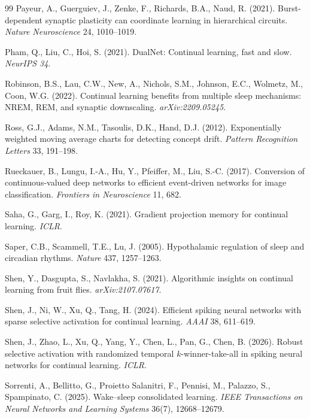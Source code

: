 \documentclass{article}
\begin{document}
\begin{thebibliography}{99}
 Payeur, A., Guerguiev, J., Zenke, F., Richards, B.A., Naud, R. (2021). Burst-dependent synaptic plasticity can coordinate learning in hierarchical circuits. \emph{Nature Neuroscience} 24, 1010--1019.

 Pham, Q., Liu, C., Hoi, S. (2021). DualNet: Continual learning, fast and slow. \emph{NeurIPS 34}.

 Robinson, B.S., Lau, C.W., New, A., Nichols, S.M., Johnson, E.C., Wolmetz, M., Coon, W.G. (2022). Continual learning benefits from multiple sleep mechanisms: NREM, REM, and synaptic downscaling. \emph{arXiv:2209.05245}.

 Ross, G.J., Adams, N.M., Tasoulis, D.K., Hand, D.J. (2012). Exponentially weighted moving average charts for detecting concept drift. \emph{Pattern Recognition Letters} 33, 191--198.

 Rueckauer, B., Lungu, I.-A., Hu, Y., Pfeiffer, M., Liu, S.-C. (2017). Conversion of continuous-valued deep networks to efficient event-driven networks for image classification. \emph{Frontiers in Neuroscience} 11, 682.

 Saha, G., Garg, I., Roy, K. (2021). Gradient projection memory for continual learning. \emph{ICLR}.

 Saper, C.B., Scammell, T.E., Lu, J. (2005). Hypothalamic regulation of sleep and circadian rhythms. \emph{Nature} 437, 1257--1263.

 Shen, Y., Dasgupta, S., Navlakha, S. (2021). Algorithmic insights on continual learning from fruit flies. \emph{arXiv:2107.07617}.

 Shen, J., Ni, W., Xu, Q., Tang, H. (2024). Efficient spiking neural networks with sparse selective activation for continual learning. \emph{AAAI} 38, 611--619.

 Shen, J., Zhao, L., Xu, Q., Yang, Y., Chen, L., Pan, G., Chen, B. (2026). Robust selective activation with randomized temporal $k$-winner-take-all in spiking neural networks for continual learning. \emph{ICLR}.


 Sorrenti, A., Bellitto, G., Proietto Salanitri, F., Pennisi, M., Palazzo, S., Spampinato, C. (2025). Wake--sleep consolidated learning. \emph{IEEE Transactions on Neural Networks and Learning Systems} 36(7), 12668--12679.


\end{thebibliography}
\end{document}

